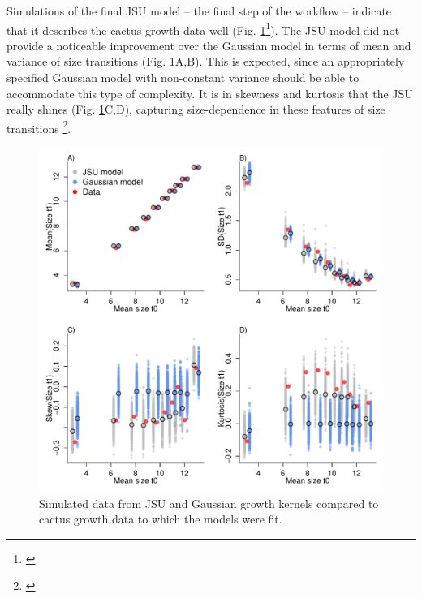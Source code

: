 \documentclass[11pt]{article}
\newcommand{\tom}[2]{{\color{red}{#1}}\footnote{\textit{\color{red}{#2}}}}
\begin{document}
{Simulations of the final JSU model -- the final step of the workflow -- indicate that it describes the cactus growth data well (Fig. \ref{fig:cactus_sim_moments}\tom{}{Thoughts about moments versus quantiles?}). 
The JSU model did not provide a noticeable improvement over the Gaussian model in terms of mean and variance of size transitions (Fig. \ref{fig:cactus_sim_moments}A,B).
This is expected, since an appropriately specified Gaussian model with non-constant variance should be able to accommodate this type of complexity.
It is in skewness and kurtosis that the JSU really shines (Fig. \ref{fig:cactus_sim_moments}C,D), capturing size-dependence in these features of size transitions \tom{that the Gaussian model misses}{Not sure if this is too much of a straw-man type comparison. We knew from the outset that the data are not Gaussian. Still, it's nice to see the improvement.}. 

\begin{figure}
\centering
\includegraphics[width=\textwidth]{figures/cactus_sim_moments}
\caption{Simulated data from JSU and Gaussian growth kernels compared to cactus growth data to which the models were fit.}
\label{fig:cactus_sim_moments}
\end{figure} 

}
\end{document}
